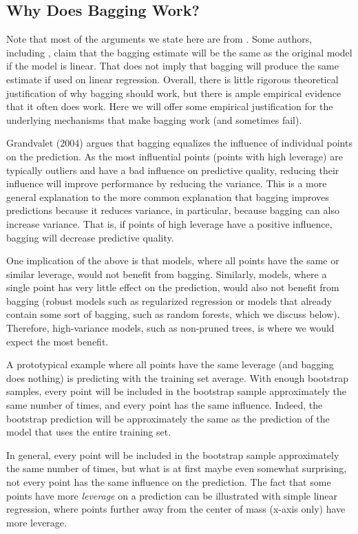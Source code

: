 \begin{refsection}
\subsection*{Why Does Bagging Work?}

Note that most of the arguments we state here are from \citep{Grandvalet2004}. Some authors, including \citep{ESL}, claim that the bagging estimate will be the same as the original model if the model is linear. That does not imply that bagging will produce the same estimate if used on linear regression. Overall, there is little rigorous theoretical justification of why bagging should work, but there is ample empirical evidence that it often does work. Here we will offer some empirical justification for the underlying mechanisms that make bagging work (and sometimes fail).

Grandvalet (2004) argues that bagging equalizes the influence of individual points on the prediction. As the most influential points (points with high leverage) are typically outliers and have a bad influence on predictive quality, reducing their influence will improve performance by reducing the variance. This is a more general explanation to the more common explanation that bagging improves predictions because it reduces variance, in particular, because bagging can also increase variance. That is, if points of high leverage have a positive influence, bagging will decrease predictive quality.

One implication of the above is that models, where all points have the same or similar leverage, would not benefit from bagging. Similarly, models, where a single point has very little effect on the prediction, would also not benefit from bagging (robust models such as regularized regression or models that already contain some sort of bagging, such as random forests, which we discuss below). Therefore, high-variance models, such as non-pruned trees, is where we would expect the most benefit.

A prototypical example where all points have the same leverage (and bagging does nothing) is predicting with the training set average. With enough bootstrap samples, every point will be included in the bootstrap sample approximately the same number of times, and every point has the same influence. Indeed, the bootstrap prediction will be approximately the same as the prediction of the model that uses the entire training set.

In general, every point will be included in the bootstrap sample approximately the same number of times, but what is at first maybe even somewhat surprising, not every point has the same influence on the prediction. The fact that some points have more {\em leverage} on a prediction can be illustrated with simple linear regression, where points further away from the center of mass (x-axis only) have more leverage.


\end{refsection}
